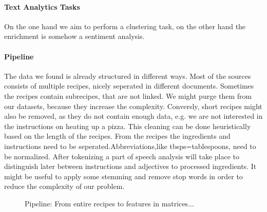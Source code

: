 \documentclass[
     12pt,         %
     a4paper,      %
     BCOR10mm,     %
     DIV14,        %
     ]{article}
\begin{document}
\paragraph{Text Analytics Tasks} On the one hand we aim to perform a clustering task, on the other hand the enrichment  is somehow a sentiment analysis. %

\paragraph{Pipeline} The data we found is already structured in different ways. Most of the sources consists of multiple recipes, nicely seperated in different documents.
Sometimes the recipes contain subrecipes, that are not linked. We might purge them from our datasets, because they increase the complexity. Conversly, short recipes 
might also be removed, as they do not contain enough data, e.g. we are not interested in the instructions on heating up a pizza.
This cleaning can be done heuristically based on the length of the recipes. From the recipes the ingredients and instructions need to be seperated.Abbreviations,like tbsps=tablespoons,
need to be normalized.
After tokenizing a part of speech analysis will take place to distinguish later between instructions and adjectives to processed ingredients.
It might  be useful to apply some stemming and remove stop words in order to reduce the complexity of our problem. 


\begin{figure}[b!]
  \centering

  \caption{Pipeline: From entire recipes to features in matrices...}
  \label{fig:pipeline}
\end{figure}
\end{document}
